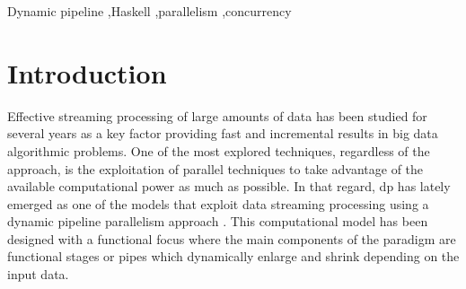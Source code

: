 \documentclass[preprint]{elsarticle}
\begin{document}
\begin{abstract}
\end{abstract}

\begin{keyword}
Dynamic pipeline \sep Haskell \sep parallelism \sep concurrency
\end{keyword}

\maketitle

\section{Introduction}
Effective streaming processing of large amounts of data has been studied for several years \cite{enumeratingsg, onthefly, exploting} as a key factor providing fast and incremental results in big data algorithmic problems. One of the most explored techniques, regardless of the approach, is the exploitation of parallel techniques to take advantage of the available computational power as much as possible. In that regard, \acrfull{dp} \cite{dpdef} has lately emerged as one of the models that exploit data streaming processing using a dynamic pipeline parallelism approach \cite{onthefly}. This computational model has been designed with a functional focus where the main components of the paradigm are functional stages or pipes which dynamically enlarge and shrink depending on the input data.  
\end{document}
